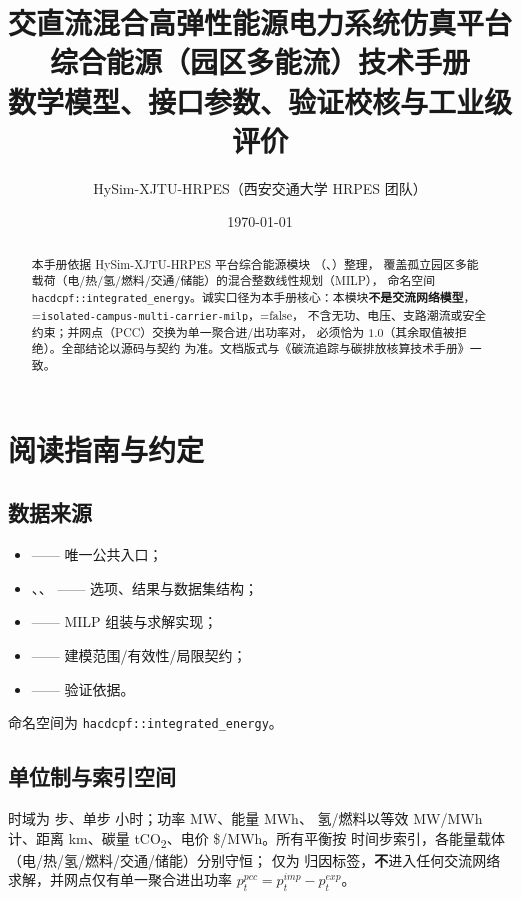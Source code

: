 \documentclass[UTF8,fontset=fandol,a4paper,11pt]{ctexart}
\title{\textbf{交直流混合高弹性能源电力系统仿真平台}\\[0.5em]
       {\Large 综合能源（园区多能流）技术手册}\\[0.3em]
       {\large 数学模型、接口参数、验证校核与工业级评价}}
\author{HySim-XJTU-HRPES（西安交通大学 HRPES 团队）}
\date{\today}
\begin{document}
\maketitle
\begin{abstract}
\noindent 本手册依据 HySim-XJTU-HRPES 平台综合能源模块
（、）整理，
覆盖孤立园区多能载荷（电/热/氢/燃料/交通/储能）的混合整数线性规划（MILP），
命名空间 \texttt{hacdcpf::integrated\_energy}。诚实口径为本手册核心：本模块\textbf{不是交流网络模型}，
=\texttt{isolated-campus-multi-carrier-milp}，=false，
不含无功、电压、支路潮流或安全约束；并网点（PCC）交换为单一聚合进/出功率对，
 必须恰为 $1.0$（其余取值被拒绝）。全部结论以源码与契约
 为准。文档版式与《碳流追踪与碳排放核算技术手册》一致。
\end{abstract}

\tableofcontents
\newpage

\section{阅读指南与约定}
\subsection{数据来源}
\begin{itemize}
  \item {} —— 唯一公共入口；
  \item {}、、
         —— 选项、结果与数据集结构；
  \item {} —— MILP 组装与求解实现；
  \item {} —— 建模范围/有效性/局限契约；
  \item {} —— 验证依据。
\end{itemize}
命名空间为 \texttt{hacdcpf::integrated\_energy}。

\subsection{单位制与索引空间}
时域为  步、单步  小时；功率 MW、能量 MWh、
氢/燃料以等效 MW/MWh 计、距离 km、碳量 tCO\textsubscript{2}、电价 \$/MWh。所有平衡按
时间步索引，各能量载体（电/热/氢/燃料/交通/储能）分别守恒； 仅为
归因标签，\textbf{不}进入任何交流网络求解，并网点仅有单一聚合进出功率
$p^{pcc}_t=p^{imp}_t-p^{exp}_t$。
\end{document}
